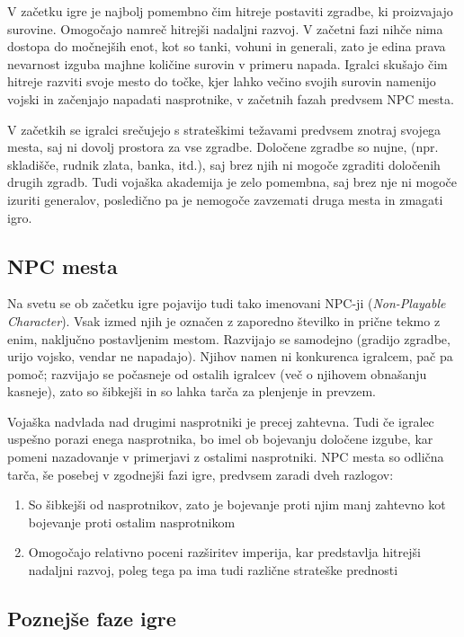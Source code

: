\documentclass[a4paper, 16pt]{article}
\begin{document}
V začetku igre je najbolj pomembno čim hitreje postaviti zgradbe, ki proizvajajo surovine. Omogočajo namreč hitrejši nadaljni razvoj. V začetni fazi
nihče nima dostopa do močnejših enot, kot so tanki, vohuni in generali, zato je edina prava nevarnost izguba majhne količine surovin v primeru napada. 
Igralci skušajo čim hitreje razviti svoje mesto do točke, kjer lahko večino svojih surovin namenijo vojski in začenjajo napadati nasprotnike, v začetnih fazah predvsem NPC mesta.

V začetkih se igralci srečujejo s strateškimi težavami predvsem znotraj svojega mesta, saj ni dovolj prostora za vse zgradbe. Določene zgradbe so nujne, (npr. skladišče, rudnik zlata, banka, itd.), saj brez njih
ni mogoče zgraditi določenih drugih zgradb. Tudi vojaška akademija je zelo pomembna, saj brez nje ni mogoče izuriti generalov, posledično pa je nemogoče zavzemati druga mesta in zmagati igro.

\subsection{NPC mesta}

Na svetu se ob začetku igre pojavijo tudi tako imenovani NPC-ji (\textit{Non-Playable Character}). Vsak izmed njih je označen z zaporedno številko in prične tekmo z enim, naključno postavljenim mestom. Razvijajo se 
samodejno (gradijo zgradbe, urijo vojsko, vendar ne napadajo). Njihov namen ni konkurenca igralcem, pač pa pomoč; razvijajo se počasneje od ostalih igralcev (več o njihovem obnašanju kasneje), zato so šibkejši in so lahka tarča za plenjenje in prevzem.

Vojaška nadvlada nad drugimi nasprotniki je precej zahtevna. Tudi če igralec uspešno porazi enega nasprotnika, bo imel ob bojevanju določene izgube, kar pomeni nazadovanje v primerjavi z ostalimi nasprotniki.
NPC mesta so odlična tarča, še posebej v zgodnejši fazi igre, predvsem zaradi dveh razlogov:
\begin{enumerate}
    \item So šibkejši od nasprotnikov, zato je bojevanje proti njim manj zahtevno kot bojevanje proti ostalim nasprotnikom
    \item Omogočajo relativno poceni razširitev imperija, kar predstavlja hitrejši nadaljni razvoj, poleg tega pa ima tudi različne strateške prednosti
\end{enumerate}

\subsection{Poznejše faze igre}
\end{document}
